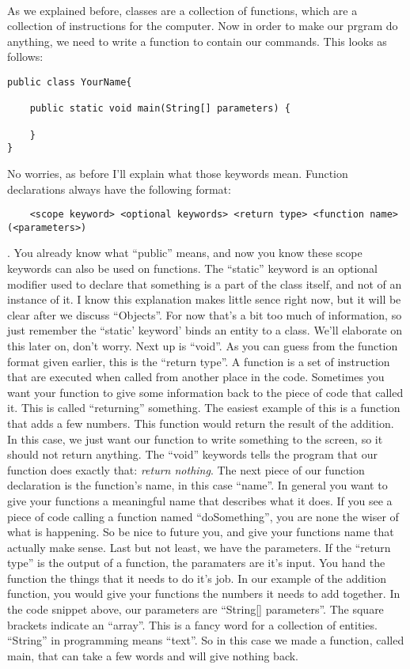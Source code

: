 \documentclass[11pt,fleqn]{book} %
\begin{document}
\paragraph{}
As we explained before, classes are a collection of functions, which are a collection of instructions for the computer. Now in order to make our prgram do anything, we need to write a function to contain our commands. This looks as follows:
\begin{lstlisting}
public class YourName{

	public static void main(String[] parameters) {
	
	}	
}
\end{lstlisting}
No worries, as before I'll explain what those keywords mean. 
Function declarations always have the following format: 
\begin{verbatim}
	<scope keyword> <optional keywords> <return type> <function name>(<parameters>)
\end{verbatim}.
You already know what ``public'' means, and now you know these scope keywords can also be used on functions.
The ``static'' keyword is an optional modifier used to declare that something is a part of the class itself, and not of an instance of it. I know this explanation makes little sence right now, but it will be clear after we discuss ``Objects''. For now that's a bit too much of information, so just remember the ``static' keyword' binds an entity to a class. We'll elaborate on this later on, don't worry. 
Next up is ``void''. As you can guess from the function format given earlier, this is the ``return type''. A function is a set of instruction that are executed when called from another place in the code. Sometimes you want your function to give some information back to the piece of code that called it. This is called ``returning'' something. The easiest example of this is a function that adds a few numbers. This function would return the result of the addition. In this case, we just want our function to write something to the screen, so it should not return anything. The ``void'' keywords tells the program that our function does exactly that: \emph{return nothing}. 
The next piece of our function declaration is the function's name, in this case ``name''. In general you want to give your functions a meaningful name that describes what it does. If you see a piece of code calling a function named ``doSomething'', you are none the wiser of what is happening. So be nice to future you, and give your functions name that actually make sense.
Last but not least, we have the parameters. If the ``return type'' is the output of a function, the paramaters are it's input. You hand the function the things that it needs to do it's job.
In our example of the addition function, you would give your functions the numbers it needs to add together.
In the code snippet above, our parameters are ``String[] parameters''. The square brackets indicate an ``array''. This is a fancy word for a collection of entities. ``String'' in programming means ``text''. So in this case we made a function, called main, that can take a few words and will give nothing back.
\end{document}
